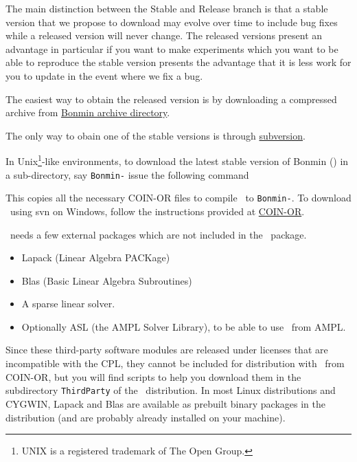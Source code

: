 The main distinction between the Stable and Release branch is that a stable version that we propose to download may evolve over time to include bug fixes while a released version will never change. The released versions present an advantage in particular if you want to make experiments which you want to be able to reproduce the stable version presents the advantage that it is less work for you to update in the event where we fix a bug.

The easiest way to obtain the released version is by downloading a compressed archive from \href{http://www.coin-or.org/Tarballs/Bonmin/}{Bonmin archive directory}.

The only way to obain one of the stable versions is through \href{http://subversion.tigris.org/}{subversion}.

In Unix\footnote{UNIX is a registered trademark of The Open
Group.}-like environments, to download the latest stable version of Bonmin (\stableVersion) in a sub-directory, say {\tt Bonmin-\stableVersion} 
issue the following command
\break

\begin{colorverb}
\end{colorverb}

\noindent This copies all the necessary COIN-OR files to compile \Bonmin\ to
{\tt Bonmin-\stableVersion}. To download \Bonmin\ using svn on Windows,
follow the instructions provided at
\href{http://www.coin-or.org/faqs.html\#q4}{COIN-OR}.

\Bonmin\ needs a few external packages which are not included in the \Bonmin\ package.
\begin{itemize}
\item Lapack (Linear Algebra PACKage)
\item Blas (Basic Linear Algebra Subroutines)
\item A sparse linear solver.
\item Optionally ASL (the AMPL Solver Library), to be able to use \Bonmin\ from AMPL.
\end{itemize}


Since these third-party software modules are released under licenses
that are incompatible with the CPL, they cannot be included for
distribution with \Bonmin\ from COIN-OR, but you will find scripts
to help you download them in the subdirectory {\tt ThirdParty} of
the \Bonmin\ distribution. In most Linux distributions and
CYGWIN, Lapack and Blas are available as prebuilt binary packages in
the distribution (and are probably already installed on your
machine). 

